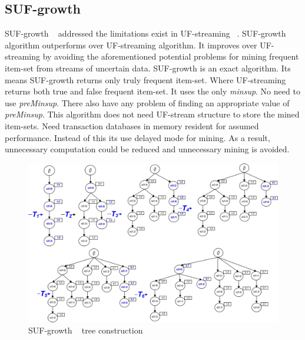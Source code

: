     \subsection{SUF-growth}
    SUF-growth ~\cite{suf_growth} addressed the limitations exist in UF-streaming ~\cite{suf_growth}. SUF-growth algorithm outperforms over UF-streaming algorithm. It improves over UF-streaming by avoiding the aforementioned potential problems for mining frequent item-set from streams of uncertain data. SUF-growth is an exact algorithm. Its means SUF-growth returns only truly frequent item-set. Where UF-streaming returns both true and false frequent item-set. It uses the only \emph{minsup}. No need to use \emph{preMinsup}. There also have any problem of finding an appropriate value of \emph{preMinsup}. This algorithm does not need UF-stream structure to store the mined item-sets. Need transaction databases in memory resident for assumed performance. Instead of this its use delayed mode for mining. As a result, unnecessary computation could be reduced and unnecessary mining is avoided.
        \begin{figure}[]
        \centering
            \includegraphics[width=1\textwidth]{../images/suf_simulation}
        \caption{SUF-growth ~\cite{suf_growth} tree construction}
        \label{figure:suf_simulation}
        \end{figure}
